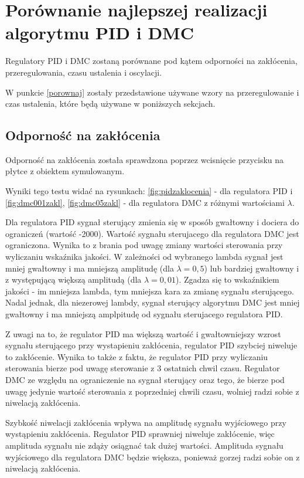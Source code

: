 \documentclass[a4paper, 10pt]{article}
\begin{document}
\section{Porównanie najlepszej realizacji algorytmu PID i DMC}

Regulatory PID i DMC zostaną porównane pod kątem odporności na zakłócenia, przeregulowania, czasu ustalenia i oscylacji.

W punkcie \ref{porownaj} zostały przedstawione używane wzory na przeregulowanie i czas ustalenia, które będą używane w poniższych sekcjach.

\subsection{Odporność na zakłócenia}
Odporność na zakłócenia została sprawdzona poprzez wcisnięcie przycisku na płytce z obiektem symulowanym.

Wyniki tego testu widać na rysunkach: \ref{fig:pidzaklocenia} - dla regulatora PID i  \ref{fig:dmc001zakl}, \ref{fig:dmc05zakl} - dla regulatora DMC z różnymi wartościami $\lambda$.

Dla regulatora PID sygnał sterujący zmienia się w sposób gwałtowny i dociera do ograniczeń (wartość -2000). Wartość sygnału sterujacego dla regulatora DMC jest ograniczona. Wynika to z brania pod uwagę zmiany wartości sterowania przy wyliczaniu wskaźnika jakości. W zależności od wybranego lambda sygnał jest mniej gwałtowny i ma mniejszą amplitudę (dla $\lambda = 0,5$) lub bardziej gwałtowny i z występującą większą amplitudą (dla $\lambda = 0,01$). Zgadza się to wskaźnikiem jakości - im mniejsza lambda, tym mniejsza kara za zmianę sygnału sterującego. Nadal jednak, dla niezerowej lambdy, sygnał sterujący algorytmu DMC jest mniej gwałtowny i ma mniejszą amplpitudę od sygnału sterujacego regulatora PID.

Z uwagi na to, że regulator PID ma większą wartość i gwałtowniejszy wzrost sygnału sterującego przy wystapieniu zakłócenia, regulator PID szybciej niweluje to zakłócenie. Wynika to także z faktu, że regulator PID przy wyliczaniu sterowania bierze pod uwagę sterowanie z 3 ostatnich chwil czasu. Regulator DMC ze względu na ograniczenie na sygnał sterujący oraz tego, że bierze pod uwagę jedynie wartość sterowania z poprzedniej chwili czasu, wolniej radzi sobie z niwelacją zakłócenia. 

Szybkość niwelacji zakłócenia wpływa na amplitudę sygnału wyjściowego przy wystąpieniu zakłócenia. Regulator PID sprawniej niweluje zakłócenie, więc amplituda sygnału nie zdąży osiągnać tak dużej wartości. Amplituda sygnału wyjściowego dla regulatora DMC będzie większa, ponieważ gorzej radzi sobie on z niwelacją zakłócenia. 
\end{document}

